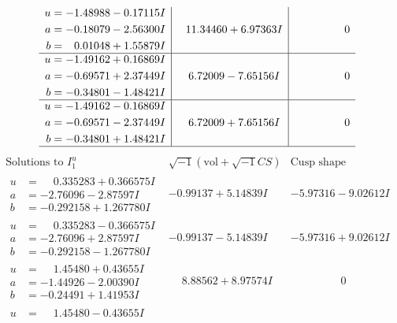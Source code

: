 \documentclass[1p]{elsarticle_modified}
\theoremstyle{definition}
\newcommand{\I}{\sqrt{-1}}
\begin{document}
$$\begin{array}{c|c|c}
\begin{aligned}
u &= -1.48988 - 0.17115 I \\
a &= -0.18079 - 2.56300 I \\
b &= \phantom{-}0.01048 + 1.55879 I\end{aligned}
 & \phantom{-}11.34460 + 6.97363 I & \phantom{-0.000000 } 0 \\ \hline\begin{aligned}
u &= -1.49162 + 0.16869 I \\
a &= -0.69571 + 2.37449 I \\
b &= -0.34801 - 1.48421 I\end{aligned}
 & \phantom{-}6.72009 - 7.65156 I & \phantom{-0.000000 } 0 \\ \hline\begin{aligned}
u &= -1.49162 - 0.16869 I \\
a &= -0.69571 - 2.37449 I \\
b &= -0.34801 + 1.48421 I\end{aligned}
 & \phantom{-}6.72009 + 7.65156 I & \phantom{-0.000000 } 0\\
 \hline 
 \end{array}$$\newpage$$\begin{array}{c|c|c}  
\text{Solutions to }I^u_{1}& \I (\text{vol} + \sqrt{-1}CS) & \text{Cusp shape}\\
 \hline 
\begin{aligned}
u &= \phantom{-}0.335283 + 0.366575 I \\
a &= -2.76096 - 2.87597 I \\
b &= -0.292158 + 1.267780 I\end{aligned}
 & -0.99137 + 5.14839 I & -5.97316 - 9.02612 I \\ \hline\begin{aligned}
u &= \phantom{-}0.335283 - 0.366575 I \\
a &= -2.76096 + 2.87597 I \\
b &= -0.292158 - 1.267780 I\end{aligned}
 & -0.99137 - 5.14839 I & -5.97316 + 9.02612 I \\ \hline\begin{aligned}
u &= \phantom{-}1.45480 + 0.43655 I \\
a &= -1.44926 - 2.00390 I \\
b &= -0.24491 + 1.41953 I\end{aligned}
 & \phantom{-}8.88562 + 8.97574 I & \phantom{-0.000000 } 0 \\ \hline\begin{aligned}
u &= \phantom{-}1.45480 - 0.43655 I \\

\end{aligned}
\end{array}$$
\end{document}
